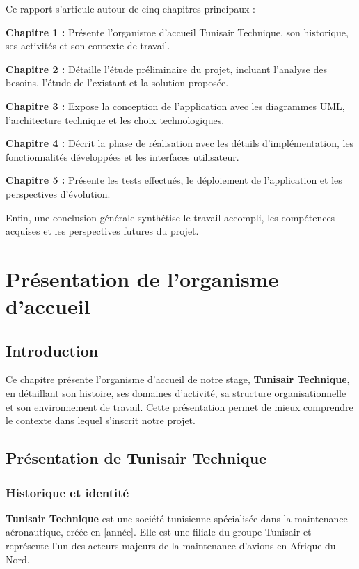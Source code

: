 \documentclass[12pt,a4paper]{report}
\begin{document}
Ce rapport s'articule autour de cinq chapitres principaux :

\textbf{Chapitre 1 :} Présente l'organisme d'accueil Tunisair Technique, son historique, ses activités et son contexte de travail.

\textbf{Chapitre 2 :} Détaille l'étude préliminaire du projet, incluant l'analyse des besoins, l'étude de l'existant et la solution proposée.

\textbf{Chapitre 3 :} Expose la conception de l'application avec les diagrammes UML, l'architecture technique et les choix technologiques.

\textbf{Chapitre 4 :} Décrit la phase de réalisation avec les détails d'implémentation, les fonctionnalités développées et les interfaces utilisateur.

\textbf{Chapitre 5 :} Présente les tests effectués, le déploiement de l'application et les perspectives d'évolution.

Enfin, une conclusion générale synthétise le travail accompli, les compétences acquises et les perspectives futures du projet.

\chapter{Présentation de l'organisme d'accueil}

\section{Introduction}

Ce chapitre présente l'organisme d'accueil de notre stage, \textbf{Tunisair Technique}, en détaillant son histoire, ses domaines d'activité, sa structure organisationnelle et son environnement de travail. Cette présentation permet de mieux comprendre le contexte dans lequel s'inscrit notre projet.

\section{Présentation de Tunisair Technique}

\subsection{Historique et identité}

\textbf{Tunisair Technique} est une société tunisienne spécialisée dans la maintenance aéronautique, créée en [année]. Elle est une filiale du groupe Tunisair et représente l'un des acteurs majeurs de la maintenance d'avions en Afrique du Nord.
\end{document}
